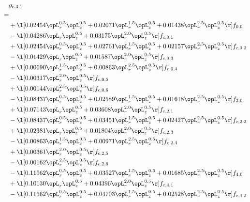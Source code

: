 \begin{alignat}{2} 
\label{eq:g_31_0} 
& g_{c,3,1} \nonumber \\ 
 = \\ 
& + \l[  0.02454 \opL_r^{0.5} \opL_z^{0.5} +  0.02071 \opL_r^{1.5} \opL_z^{0.5} +  0.01438 \opL_r^{2.5} \opL_z^{0.5}  \r] f_{0,0} \nonumber \\ 
& - \l[  0.04286 \opL_r \opL_z^{0.5} +  0.03175 \opL_r^{2.0} \opL_z^{0.5}  \r] f_{c,0,1} \nonumber \\ 
& + \l[  0.02454 \opL_r^{0.5} \opL_z^{0.5} +  0.02761 \opL_r^{1.5} \opL_z^{0.5} +  0.02157 \opL_r^{2.5} \opL_z^{0.5}  \r] f_{c,0,2} \nonumber \\ 
& - \l[  0.01429 \opL_r \opL_z^{0.5} +  0.01587 \opL_r^{2.0} \opL_z^{0.5}  \r] f_{c,0,3} \nonumber \\ 
& + \l[  0.00690 \opL_r^{1.5} \opL_z^{0.5} +  0.00863 \opL_r^{2.5} \opL_z^{0.5}  \r] f_{c,0,4} \nonumber \\ 
& - \l[  0.00317 \opL_r^{2.0} \opL_z^{0.5}  \r] f_{c,0,5} \nonumber \\ 
& + \l[  0.00144 \opL_r^{2.5} \opL_z^{0.5}  \r] f_{c,0,6} \nonumber \\ 
& - \l[  0.08437 \opL_r^{0.5} \opL_z^{0.5} +  0.02589 \opL_r^{1.5} \opL_z^{0.5} +  0.01618 \opL_r^{2.5} \opL_z^{0.5}  \r] f_{2,0} \nonumber \\ 
& + \l[  0.07143 \opL_r \opL_z^{0.5} +  0.03608 \opL_r^{2.0} \opL_z^{0.5}  \r] f_{c,2,1} \nonumber \\ 
& - \l[  0.08437 \opL_r^{0.5} \opL_z^{0.5} +  0.03451 \opL_r^{1.5} \opL_z^{0.5} +  0.02427 \opL_r^{2.5} \opL_z^{0.5}  \r] f_{c,2,2} \nonumber \\ 
& + \l[  0.02381 \opL_r \opL_z^{0.5} +  0.01804 \opL_r^{2.0} \opL_z^{0.5}  \r] f_{c,2,3} \nonumber \\ 
& - \l[  0.00863 \opL_r^{1.5} \opL_z^{0.5} +  0.00971 \opL_r^{2.5} \opL_z^{0.5}  \r] f_{c,2,4} \nonumber \\ 
& + \l[  0.00361 \opL_r^{2.0} \opL_z^{0.5}  \r] f_{c,2,5} \nonumber \\ 
& - \l[  0.00162 \opL_r^{2.5} \opL_z^{0.5}  \r] f_{c,2,6} \nonumber \\ 
& - \l[  0.11562 \opL_r^{0.5} \opL_z^{0.5} +  0.03527 \opL_r^{1.5} \opL_z^{0.5} +  0.01685 \opL_r^{2.5} \opL_z^{0.5}  \r] f_{4,0} \nonumber \\ 
& + \l[  0.10130 \opL_r \opL_z^{0.5} +  0.04396 \opL_r^{2.0} \opL_z^{0.5}  \r] f_{c,4,1} \nonumber \\ 
& - \l[  0.11562 \opL_r^{0.5} \opL_z^{0.5} +  0.04703 \opL_r^{1.5} \opL_z^{0.5} +  0.02528 \opL_r^{2.5} \opL_z^{0.5}  \r] f_{c,4,2} \nonumber \\ 

\end{alignat}
